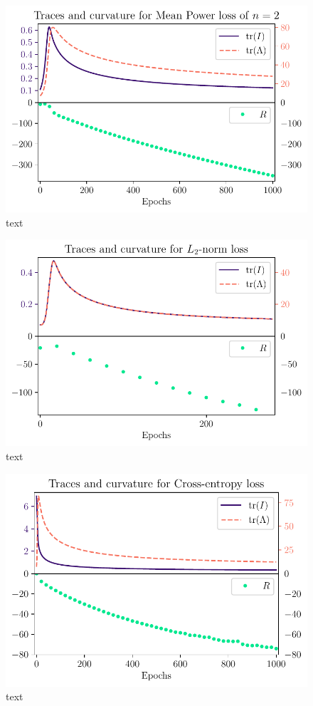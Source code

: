 \begin{figure}
	\centering
	\includegraphics{Experiment2/plots/MeanPowerLoss2_Curves.pdf}
	\caption{text}
\end{figure}

\begin{figure}
	\centering
	\includegraphics{Experiment2/plots/LPNormLoss2_Curves.pdf}
	\caption{text}
\end{figure}

\begin{figure}
	\centering
	\includegraphics{Experiment2/plots/CrossEntropyLoss_Curves.pdf}
	\caption{text}
\end{figure}
